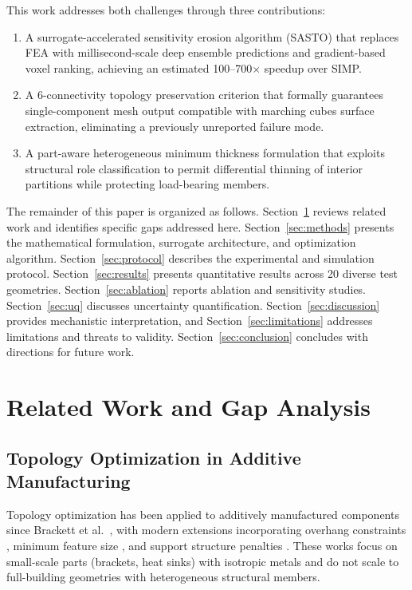 \documentclass[11pt]{article}
\theoremstyle{plain}
\theoremstyle{definition}
\theoremstyle{remark}
\begin{document}
This work addresses both challenges through three contributions:
\begin{enumerate}[label=(\roman*),leftmargin=2em]
\item A surrogate-accelerated sensitivity erosion algorithm (SASTO) that replaces FEA with millisecond-scale deep ensemble predictions and gradient-based voxel ranking, achieving an estimated 100--700$\times$ speedup over SIMP.
\item A 6-connectivity topology preservation criterion that formally guarantees single-component mesh output compatible with marching cubes surface extraction, eliminating a previously unreported failure mode.
\item A part-aware heterogeneous minimum thickness formulation that exploits structural role classification to permit differential thinning of interior partitions while protecting load-bearing members.
\end{enumerate}

The remainder of this paper is organized as follows. Section~\ref{sec:related} reviews related work and identifies specific gaps addressed here. Section~\ref{sec:methods} presents the mathematical formulation, surrogate architecture, and optimization algorithm. Section~\ref{sec:protocol} describes the experimental and simulation protocol. Section~\ref{sec:results} presents quantitative results across 20 diverse test geometries. Section~\ref{sec:ablation} reports ablation and sensitivity studies. Section~\ref{sec:uq} discusses uncertainty quantification. Section~\ref{sec:discussion} provides mechanistic interpretation, and Section~\ref{sec:limitations} addresses limitations and threats to validity. Section~\ref{sec:conclusion} concludes with directions for future work.


\section{Related Work and Gap Analysis}
\label{sec:related}

\subsection{Topology Optimization in Additive Manufacturing}

Topology optimization has been applied to additively manufactured components since Brackett et al.\ \cite{brackett2011}, with modern extensions incorporating overhang constraints \cite{langelaar2016}, minimum feature size \cite{guest2004}, and support structure penalties \cite{gaynor2016}. These works focus on small-scale parts (brackets, heat sinks) with isotropic metals and do not scale to full-building geometries with heterogeneous structural members.
\end{document}
